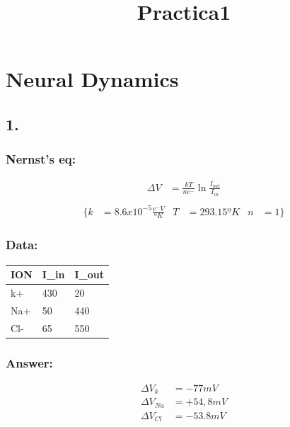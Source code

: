 \documentclass[11pt]{article}
\title{Practica1}
\begin{document}
    
    
    \maketitle
    
    

    
    \section{Neural Dynamics}\label{neural-dynamics}

\subsection{1.}\label{section}

\subsubsection{Nernst's eq:}\label{nernsts-eq}

\begin{align*}
\Delta V &= \frac{kT}{ne^-}\ln{\frac{I_{out}}{I_{in}}} \\
\end{align*}\begin{align*}
\Bigg\{ k  &= 8.6x10^{-5}\frac{e^-V}{ºK}  &  T  &= 293.15ºK  &  n  &= 1 \Bigg\}
\end{align*}

\subsubsection{Data:}\label{data}

\begin{longtable}[]{@{}lll@{}}
\toprule
ION & I\_in & I\_out\tabularnewline
\midrule
\endhead
k+ & 430 & 20\tabularnewline
Na+ & 50 & 440\tabularnewline
Cl- & 65 & 550\tabularnewline
\bottomrule
\end{longtable}

\subsubsection{Answer:}\label{answer}

\begin{align}
\Delta V_{k} & = -77mV \\
\Delta V_{Na} & = +54,8mV \\
\Delta V_{Cl} & = -53.8mV \\
\end{align}
\end{document}
